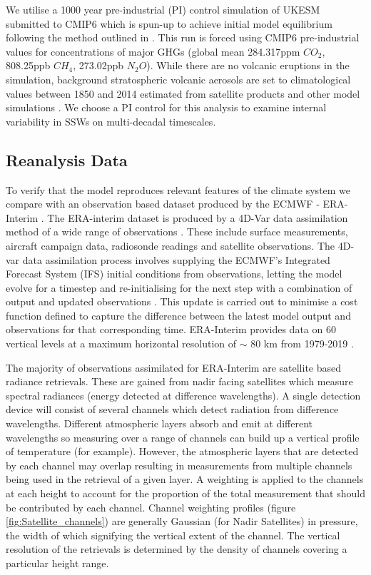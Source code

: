 We utilise a 1000 year pre-industrial (PI) control simulation of UKESM submitted to CMIP6 which is spun-up to achieve initial model equilibrium following the method outlined in \cite{Yool20}. This run is forced using CMIP6 pre-industrial values for concentrations of major GHGs (global mean 284.317ppm $CO_2$, 808.25ppb $CH_4$, 273.02ppb $N_2O$). While there are no volcanic eruptions in the simulation, background stratospheric volcanic aerosols are set to climatological values between 1850 and 2014 estimated from satellite products and other model simulations \citep{Menary2018}. We choose a PI control for this analysis to examine internal variability in SSWs on multi-decadal timescales. 


\subsection{Reanalysis Data}
\label{sec:ERA_data}
To verify that the model reproduces relevant features of the climate system we compare with an observation based dataset produced by the ECMWF - ERA-Interim \cite{Dee2011}. The ERA-interim dataset is produced by a 4D-Var data assimilation method of a wide range of observations \citep{Uppala2005}. These include surface measurements, aircraft campaign data, radiosonde readings and satellite observations. The 4D-var data assimilation process involves supplying the ECMWF’s Integrated Forecast System (IFS) initial conditions from observations, letting the model evolve for a timestep and re-initialising for the next step with a combination of output and updated observations \citep{Courtier1998, Bouttier2001}. This update is carried out to minimise a cost function defined to capture the difference between the latest model output and observations for that corresponding time. ERA-Interim provides data on 60 vertical levels at a maximum horizontal resolution of $\sim$ 80 km from 1979-2019 \citep{Berrisford}.

The majority of observations assimilated for ERA-Interim are satellite based radiance retrievals. These are gained from nadir facing satellites which measure spectral radiances (energy detected at difference wavelengths). A single detection device will consist of several channels which detect radiation from difference wavelengths. Different atmospheric layers absorb and emit at different wavelengths so measuring over a range of channels can build up a vertical profile of temperature (for example). However, the atmospheric layers that are detected by each channel may overlap resulting in measurements from multiple channels being used in the retrieval of a given layer. A weighting is applied to the channels at each height to account for the proportion of the total measurement that should be contributed by each channel. Channel weighting profiles (figure \ref{fig:Satellite_channels}) \citep{Fujiwara17} are generally Gaussian (for Nadir Satellites) in pressure, the width of which signifying the vertical extent of the channel. The vertical resolution of the retrievals is determined by the density of channels covering a particular height range. 

